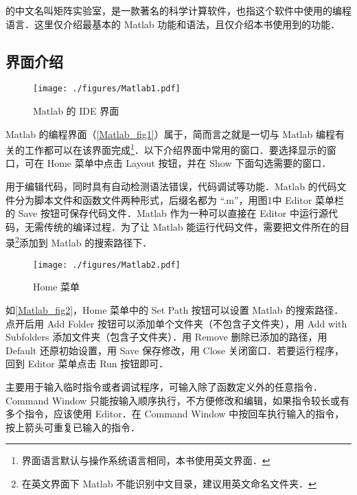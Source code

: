 
的中文名叫矩阵实验室，是一款著名的科学计算软件，也指这个软件中使用的编程语言．这里仅介绍最基本的 Matlab 功能和语法，且仅介绍本书使用到的功能．


\subsection{界面介绍}

\begin{figure}[ht]
\centering
\texttt{[image: ./figures/Matlab1.pdf]}
\caption{Matlab 的 IDE 界面}\label{Matlab_fig1}
\end{figure}

Matlab 的编程界面（\autoref{Matlab_fig1}）属于，简而言之就是一切与 Matlab 编程有关的工作都可以在该界面完成\footnote{界面语言默认与操作系统语言相同，本书使用英文界面．}．以下介绍界面中常用的窗口．要选择显示的窗口，可在 Home 菜单中点击 Layout 按钮，并在 Show 下面勾选需要的窗口．

 用于编辑代码，同时具有自动检测语法错误，代码调试等功能．Matlab 的代码文件分为脚本文件和函数文件两种形式，后缀名都为 “.m”，用图1中 Editor 菜单栏的 Save 按钮可保存代码文件．Matlab 作为一种可以直接在 Editor 中运行源代码，无需传统的编译过程．为了让 Matlab 能运行代码文件，需要把文件所在的目录\footnote{在英文界面下 Matlab 不能识别中文目录，建议用英文命名文件夹．}添加到 Matlab 的搜索路径下．

\begin{figure}[ht]
\centering
\texttt{[image: ./figures/Matlab2.pdf]}
\caption{Home 菜单}\label{Matlab_fig2}
\end{figure}

如\autoref{Matlab_fig2}，Home 菜单中的 Set Path 按钮可以设置 Matlab 的搜索路径．点开后用 Add Folder 按钮可以添加单个文件夹（不包含子文件夹），用 Add with Subfolders 添加文件夹（包含子文件夹）．用 Remove 删除已添加的路径，用 Default 还原初始设置，用 Save 保存修改，用 Close 关闭窗口．若要运行程序，回到 Editor 菜单点击 Run 按钮即可．

 主要用于输入临时指令或者调试程序，可输入除了函数定义外的任意指令．Command Window 只能按输入顺序执行，不方便修改和编辑，如果指令较长或有多个指令，应该使用 Editor．在 Command Window 中按回车执行输入的指令，按上箭头可重复已输入的指令．


